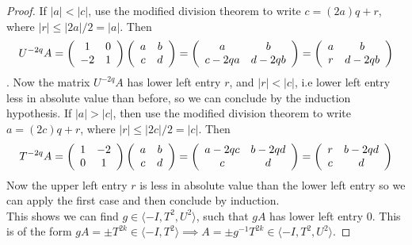 \begin{proof}
If $|a| < |c|$, use the modified division theorem to write $c = (2a)q + r$, where $|r| \leq |2a|/2 =|a|$. Then 
$$U^{-2q}A =  \left(\begin{array}{ c c } 1 & 0 \\ -2 & 1 \end{array} \right)\left(\begin{array}{ c c } a & b \\ c & d \end{array} \right) = \left(\begin{array}{ c c } a & b \\ c-2qa & d-2qb \end{array} \right) = \left(\begin{array}{ c c } a & b \\ r & d-2qb \end{array} \right)$$.
Now the matrix $U^{-2q}A$ has lower left entry $r$, and $|r| < |c|$, i.e lower left entry less in absolute value than before, so we can conclude by the induction hypothesis.
If $|a| > |c|$, then use the modified division theorem to write $a = (2c)q + r$, where $|r| \leq |2c|/2 = |c|$. Then 
$$T^{-2q}A = \left(\begin{array}{ c c } 1 & -2 \\ 0 & 1 \end{array} \right)\left(\begin{array}{ c c } a & b \\ c & d \end{array} \right) =  \left(\begin{array}{ c c } a-2qc & b-2qd \\ c & d \end{array} \right) = \left(\begin{array}{ c c } r & b-2qd \\ c & d \end{array} \right)$$ 
Now the upper left entry $r$ is less in absolute value than the lower left entry so we can apply the first case and then conclude by induction.
\\
This shows we can find $g \in  \langle -I, T^2, U^2 \rangle$, such that $gA$ has lower left entry 0. This is of the form $gA = \pm T^{2k} \in \langle -I, T^2 \rangle \implies A = \pm g^{-1} T^{2k} \in \langle -I, T^2, U^2 \rangle$.

\end{proof}




